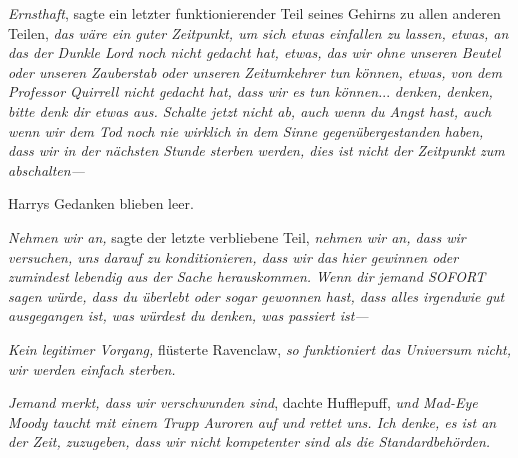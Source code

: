 \emph{Ernsthaft}, sagte ein letzter funktionierender Teil seines Gehirns zu allen anderen Teilen, \emph{das wäre ein guter Zeitpunkt, um sich etwas einfallen zu lassen, etwas, an das der Dunkle Lord noch nicht gedacht hat, etwas, das wir ohne unseren Beutel oder unseren Zauberstab oder unseren Zeitumkehrer tun können, etwas, von dem Professor Quirrell nicht gedacht hat, dass wir es tun können.}.. \emph{denken, denken, bitte denk dir etwas aus. Schalte jetzt nicht ab, auch wenn du Angst hast, auch wenn wir dem Tod noch nie wirklich in dem Sinne gegenübergestanden haben, dass wir in der nächsten Stunde sterben werden, \emph{dies ist nicht der Zeitpunkt zum abschalten}—}

Harrys Gedanken blieben leer.

\emph{Nehmen wir an,} sagte der letzte verbliebene Teil, \emph{nehmen wir an, dass wir versuchen, uns darauf zu konditionieren, dass wir das hier gewinnen oder zumindest lebendig aus der Sache herauskommen. Wenn dir jemand SOFORT sagen würde, dass du überlebt oder sogar gewonnen hast, dass alles irgendwie gut ausgegangen ist, was würdest du denken, was passiert ist—}

\emph{Kein legitimer Vorgang,} flüsterte Ravenclaw, \emph{so funktioniert das Universum nicht, wir werden einfach sterben.}

\emph{Jemand merkt, dass wir verschwunden sind}, dachte Hufflepuff, \emph{und Mad-Eye Moody taucht mit einem Trupp Auroren auf und rettet uns. Ich denke, es ist an der Zeit, zuzugeben, dass wir nicht kompetenter sind als die Standardbehörden.}


